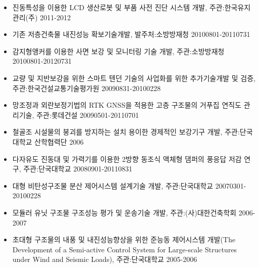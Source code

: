 \documentclass[10pt,a4paper,ragged2e]{altacv}
\begin{document}
\begin{fullwidth}
\begin{itemize}
		\item 진동특성을 이용한 LCD 생산로봇 및 부품 사전 진단 시스템 개발, 주관:한국유지관리(주) \hfill2011-2012
		\item 기존 저층건축물 내진성능 확보기술개발, 발주처:소방방재청 \hfill 20100801-20110731
		\item 감지형앵커를 이용한 사면 보강 및 모니터링 기술 개발, 주관:소방방재청 \hfill 20100801-20120731
		\item 교량 및 지반보강을 위한 스마트 텐던 기술의 사업화를 위한 추가기술개발 및 검증, 주관:한국건설교통기술평가원 \hfill 20090831-20100228
		\item 망조정과 외란보정기법의 RTK GNSS을 적용한 고층 구조물의 거푸집 연직도 관리기술, 주관:롯데건설 \hfill 20090501-20110701
		\item 철골조 시설물의 붕괴를 방지하는 설치 용이한 경제적인 보강기구 개발, 주관:단국대학교 산학협력단 \hfill2006
		\item 다자유도 진동대 및 가력기를 이용한 2방향 동조식 액체형 댐퍼의 풍응답 저감 연구, 주관:단국대학교 \hfill20080901-20110831
		\item 대형 비탄성구조물 분산 제어시스템 설계기술 개발, 주관:단국대학교 \hfill20070301-20100228
		\item 모듈러 유닛 구조물 구조성능 평가 및 운송기술 개발, 주관:(사)대한건축학회 \hfill2006-2007
		\item 초대형 구조물의 내풍 및 내진성능향상을 위한 준능동 제어시스템 개발(The Development of a Semi-active Control System for Large-scale Structures under Wind and Seismic Loads), 주관:단국대학교 \hfill2005-2006
	\end{itemize}

\end{fullwidth}
\end{document}

